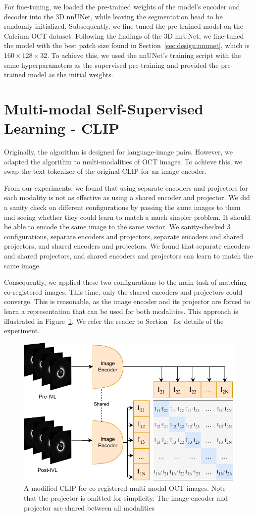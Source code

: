 \documentclass[a4paper,11pt,oneside]{report}
\begin{document}
For fine-tuning, we loaded the pre-trained weights of the model's encoder and decoder into the 3D nnUNet, while leaving the segmentation head to be randomly initialized. Subsequently, we fine-tuned the pre-trained model on the Calcium OCT dataset. Following the findings of the 3D nnUNet, we fine-tuned the model with the best patch size found in Section~\ref{sec:design:nnunet}, which is $160\times 128\times 32$. To achieve this, we used the nnUNet's training script with the same hyperparameters as the supervised pre-training and provided the pre-trained model as the initial weights.

\section{Multi-modal Self-Supervised Learning - CLIP}\label{sec:implementation:clip}
Originally, the algorithm is designed for language-image pairs. However, we adapted the algorithm to multi-modalities of OCT images. To achieve this, we swap the text tokenizer of the original CLIP for an image encoder. 

From our experiments, we found that using separate encoders and projectors for each modality is not as effective as using a shared encoder and projector. We did a sanity check on different configurations by passing the same images to them and seeing whether they could learn to match a much simpler problem. It should be able to encode the same image to the same vector. We sanity-checked 3 configurations, separate encoders and projectors, separate encoders and shared projectors, and shared encoders and projectors. We found that separate encoders and shared projectors, and shared encoders and projectors can learn to match the same image.

Consequently, we applied these two configurations to the main task of matching co-registered images. This time, only the shared encoders and projectors could converge. This is reasonable, as the image encoder and its projector are forced to learn a representation that can be used for both modalities. This approach is illustrated in Figure~\ref{fig:clip-oct}. We refer the reader to Section~\cite{sec:results:discussion:clip} for details of the experiment.

\begin{figure}[hb]
    \centering
    \includegraphics[width=0.65\linewidth]{figures/fig_implementation_clip_oct.pdf}
    \caption{A modified CLIP for co-registered multi-modal OCT images. Note that the projector is omitted for simplicity. The image encoder and projector are shared between all modalities}
    \label{fig:clip-oct}
\end{figure}
\end{document}
